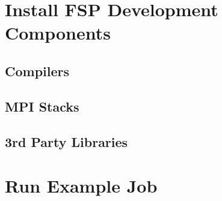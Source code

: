 \documentclass[letterpaper]{article}
\begin{document}
\section{Install FSP Development Components}
\subsection{Compilers}
\subsection{MPI Stacks}
\subsection{3rd Party Libraries}

\section{Run Example Job}
\end{document}
